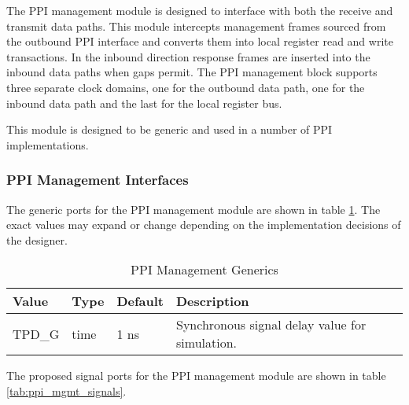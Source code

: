 \documentclass[11pt]{article}
\begin{document}
The PPI management module is designed to interface with both the receive and transmit data paths. This module intercepts management
frames sourced from the outbound PPI interface and converts them into local register read and write transactions. In the
inbound direction response frames are inserted into the inbound data paths when gaps permit. The PPI management block
supports three separate clock domains, one for the outbound data path, one for the inbound data path and the last for the local
register bus.

This module is designed to be generic and used in a number of PPI implementations.

\subsubsection{PPI Management Interfaces}

The generic ports for the PPI management module are shown in table \ref{tab:ppi_mgmt_generics}. 
The exact values may expand or change depending on the implementation decisions  of the designer. 

\begin{table}[H]
\small
\centering
   \begin{tabular}{| l | l | l | l | }
      \hline \textbf{Value} & \textbf{Type} & \textbf{Default} & \textbf{Description} \\
      \hline TPD\_G                  & time    & 1 ns  & Synchronous signal delay value for simulation.       \\
      \hline
   \end{tabular}
   \caption{PPI Management Generics}
   \label{tab:ppi_mgmt_generics}
\end{table}

The proposed signal ports for the PPI management module are shown in table \ref{tab:ppi_mgmt_signals}.
\end{document}
